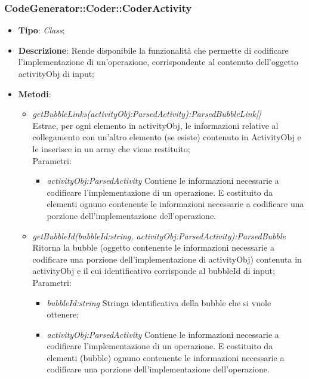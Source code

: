 \documentclass[../DefinizioneDiProdotto.tex]{subfiles}
\begin{document}
			
			
			\subsubsection{CodeGenerator::Coder::CoderActivity}
			\hypertarget{SWEDesigner::Server::CodeGenerator::Coder::CoderActivity}{}
			\begin{itemize}
				\item \textbf{Tipo}: \emph{Class};
				\item \textbf{Descrizione}: Rende disponibile la funzionalità che permette di codificare l'implementazione di un'operazione, corrispondente al contenuto dell'oggetto activityObj di input; \\
				\item \textbf{Metodi}:
				\begin{itemize}
					\item \emph{getBubbleLinks(activityObj:ParsedActivity):ParsedBubbleLink[]} \\ 
					Estrae, per ogni elemento in activityObj, le informazioni relative al collegamento con un'altro elemento (se esiste) contenuto in ActivityObj e
					le inserisce in un array che viene restituito; \\
					Parametri:
					\begin{itemize}
						\item \emph{activityObj:ParsedActivity} Contiene le informazioni necessarie a codificare l'implementazione di un operazione. E costituito da elementi ognuno contenente le informazioni necessarie a codificare una porzione dell'implementazione dell'operazione.
					\end{itemize}
					
					\item \emph{getBubbleId(bubbleId:string, activityObj:ParsedActivity):ParsedBubble} \\ 
					Ritorna la bubble (oggetto contenente le informazioni necessarie a codificare una porzione dell'implementazione di activityObj) contenuta in activityObj e il cui identificativo corrisponde al bubbleId di input; \\
					Parametri:
					\begin{itemize}
						\item \emph{bubbleId:string} Stringa identificativa della bubble che si vuole ottenere;
						\item \emph{activityObj:ParsedActivity} Contiene le informazioni necessarie a codificare l'implementazione di un operazione. E costituito da elementi (bubble) ognuno contenente le informazioni necessarie a codificare una porzione dell'implementazione dell'operazione.
					\end{itemize}
					

\end{itemize}
\end{itemize}
\end{document}
